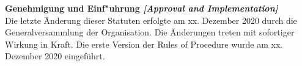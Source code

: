 \documentclass[10pt]{article}
\newcounter{qcounter}
\begin{document}
\begin{list}{{\bf Artikel :~}}{}
\item {\bf Genehmigung und Einf"uhrung {\it[Approval and Implementation]}}\\

Die letzte Änderung dieser Statuten erfolgte am xx. Dezember 2020 durch die Generalversammlung der Organisation. Die Änderungen treten mit sofortiger Wirkung in Kraft. Die erste Version der Rules of Procedure wurde am xx. Dezember 2020 eingeführt.\\

\end{list}


  
\end{document}
